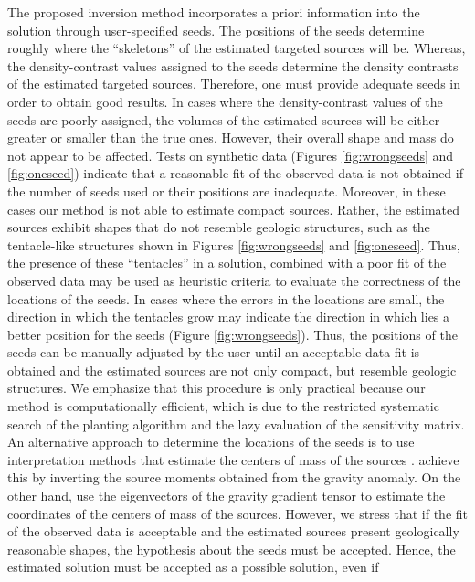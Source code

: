 The proposed inversion method
incorporates a priori information into the
solution through user-specified seeds.
The positions of the seeds determine roughly where the ``skeletons'' of the
estimated targeted sources will be.
Whereas, the density-contrast values assigned to the seeds determine the density
contrasts of the estimated targeted sources.
Therefore, one must provide adequate seeds in order to obtain good results.
In cases where the density-contrast values of the seeds are poorly assigned,
the volumes of the estimated sources will be either greater or smaller than
the true ones.
However, their overall shape and mass do not appear to be affected.
Tests on synthetic data
(Figures \ref{fig:wrongseeds} and \ref{fig:oneseed})
indicate that a reasonable fit of the observed data is not
obtained if the number of seeds used or their positions are inadequate.
Moreover, in these cases our method is not able to estimate compact sources.
Rather, the estimated sources exhibit shapes that do not resemble geologic
structures, such as the tentacle-like structures shown in
Figures \ref{fig:wrongseeds} and \ref{fig:oneseed}.
Thus, the presence of these ``tentacles'' in a solution, combined with a poor
fit of the observed data may be used as heuristic criteria to evaluate the
correctness of the locations of the seeds.
In cases where the errors in the locations are small, the direction in which
the tentacles grow may indicate the direction in which lies a better
position for the seeds (Figure \ref{fig:wrongseeds}).
Thus, the positions of the seeds can be manually adjusted by the user
until an acceptable data fit is obtained and the estimated sources are
not only compact, but resemble geologic structures.
We emphasize that this procedure is only practical because our method is
computationally efficient, which is due to the restricted systematic search of
the planting algorithm and the lazy evaluation of the sensitivity matrix.
An alternative approach to determine the locations of the seeds is to use
interpretation methods that estimate the centers of mass of the sources
\citep[e.g.,][]{medeiros, beiki}.
\citet{medeiros} achieve this by inverting the source moments obtained from the
gravity anomaly.
On the other hand, \citet{beiki} use the eigenvectors of the gravity gradient
tensor to estimate the coordinates of the centers of mass of the sources.
However, we stress that if the fit of the observed data is acceptable and the
estimated sources present geologically reasonable shapes, the hypothesis about
the seeds must be accepted.
Hence, the estimated solution must be accepted as a possible solution, even if
